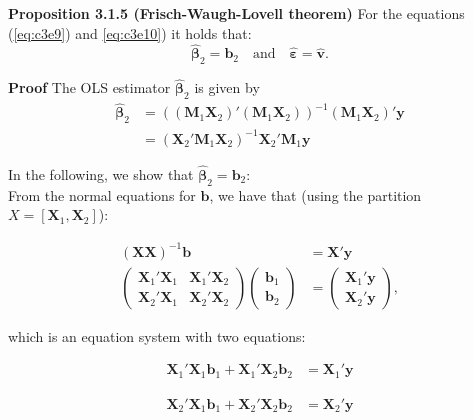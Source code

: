 \documentclass[
]{book}
\begin{document}
\textbf{Proposition 3.1.5 (Frisch-Waugh-Lovell theorem)}
For the equations (\eqref{eq:c3e9}) and \eqref{eq:c3e10}) it holds that:
\[\hat{\boldsymbol{\beta}}_2=\mathbf{b}_2\quad\text{and}\quad \hat{\boldsymbol{\varepsilon}}=\hat{\mathbf{v}}.\]

\textbf{Proof}
The OLS estimator \(\hat{\boldsymbol{\beta}}_2\) is given by
\begin{align}
\hat{\boldsymbol{\beta}}_2 &= \left((\mathbf{M}_1\mathbf{X}_2)'(\mathbf{M}_1\mathbf{X}_2)\right)^{-1}(\mathbf{M}_1\mathbf{X}_2)'\mathbf{y}\nonumber\\
 &= \left(\mathbf{X}_2'\mathbf{M}_1\mathbf{X}_2\right)^{-1}\mathbf{X}_2'\mathbf{M}_1\mathbf{y}
\label{eq:c3e11}
\end{align}

In the following, we show that \(\hat{\boldsymbol{\beta}}_2=\mathbf{b}_2\):\\
From the normal equations for \(\mathbf{b}\), we have that (using the partition
\(X =\left[\mathbf{X}_1,\mathbf{X}_2\right]\)):

\begin{align*}
(\mathbf{X}\mathbf{X})^{-1}\mathbf{b}&=\mathbf{X}'\mathbf{y}\\
\left(\begin{matrix}\mathbf{X}_1'\mathbf{X}_1&\mathbf{X}_1'\mathbf{X}_2\\\mathbf{X}_2'\mathbf{X}_1&\mathbf{X}_2'\mathbf{X}_2\end{matrix}\right)\left(\begin{matrix}\mathbf{b}_1\\\mathbf{b}_2\end{matrix}\right)&=\left(\begin{matrix}\mathbf{X}_1'\mathbf{y}\\\mathbf{X}_2'\mathbf{y}\end{matrix}\right),
\end{align*}

which is an equation system with two equations:

\begin{align}
\mathbf{X}_1'\mathbf{X}_1\mathbf{b}_1 + \mathbf{X}_1'\mathbf{X}_2\mathbf{b}_2 &=\mathbf{X}_1'\mathbf{y}
\label{eq:c3e12}
\end{align}

\begin{align}
\mathbf{X}_2'\mathbf{X}_1\mathbf{b}_1 + \mathbf{X}_2'\mathbf{X}_2\mathbf{b}_2 &=\mathbf{X}_2'\mathbf{y}
\label{eq:c3e13}
\end{align}
\end{document}
